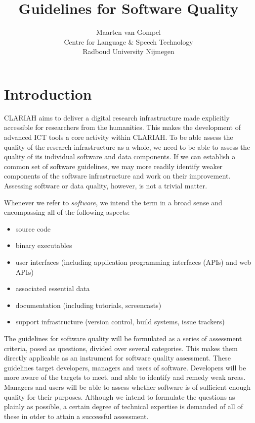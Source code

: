 \documentclass[a4paper,11pt]{article}
\newcommand{\subtitle}[1]{%
  \posttitle{%
    \par\end{center}
    \begin{center}\large#1\end{center}
    \vskip0.5em}%
}
\begin{document}
\title{Guidelines for Software Quality}
\subtitle{CLARIAH Task 54.100} 
\author{Maarten van Gompel \\ Centre for Language \& Speech Technology \\ Radboud University Nijmegen }

\maketitle
\tableofcontents

\section{Introduction}

CLARIAH aims to deliver a digital research infrastructure made explicitly
accessible for researchers from the humanities. This makes the development of advanced ICT
tools a core activity within CLARIAH. To be able assess the
quality of the research infrastructure as a whole, we need to be able to assess
the quality of its individual software and data components. If we can establish
a common set of software guidelines, we may more readily identify weaker
components of the software infrastructure and work on their improvement.
Assessing software or data quality, however, is not a trivial matter. 

Whenever we refer to \emph{software}, we intend the term in a broad sense and
encompassing all of the following aspects:
\begin{itemize}
    \item source code
    \item binary executables
    \item user interfaces (including application programming interfaces (APIs) and web APIs)
    \item associated essential data
    \item documentation (including tutorials, screencasts)
    \item support infrastructure (version control, build systems, issue trackers)
\end{itemize}

The guidelines for software quality will be formulated as a series of
assessment criteria, posed as questions, divided over several categories. This
makes them directly applicable as an instrument for software quality
assessment. These guidelines target developers, managers and users of software.
Developers will be more aware of the targets to meet, and able to identify and
remedy weak areas. Managers and users will be able to assess whether software is of
sufficient enough quality for their purposes. Although we intend to formulate
the questions as plainly as possible, a certain degree of technical
expertise is demanded of all of these in otder to attain a successful
assessment.
\end{document}
